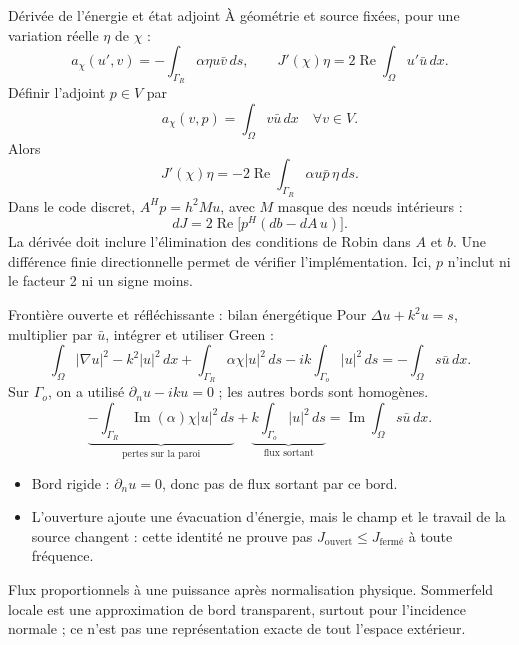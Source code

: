 \begin{frame}{Dérivée de l'énergie et état adjoint}
\small À géométrie et source fixées, pour une variation réelle $\eta$ de $\chi$ :
\[
 a_\chi(u',v)=-\int_{\Gamma_R}\alpha\eta u\bar v\,ds,
 \qquad J'(\chi)\eta=2\operatorname{Re}\int_\Omega u'\bar u\,dx.
\]
Définir l'adjoint $p\in V$ par
\[
 a_\chi(v,p)=\int_\Omega v\bar u\,dx\quad\forall v\in V.
\]
Alors
\[
 \boxed{J'(\chi)\eta=-2\operatorname{Re}\int_{\Gamma_R}\alpha u\bar p\,\eta\,ds.}
\]
Dans le code discret, $A^Hp=h^2Mu$, avec $M$ masque des nœuds intérieurs :
\[
 dJ=2\operatorname{Re}\big[p^H(db-dA\,u)\big].
\]
\scriptsize La dérivée doit inclure l'élimination des conditions de Robin dans $A$ et $b$. Une différence finie directionnelle permet de vérifier l'implémentation. Ici, $p$ n'inclut ni le facteur 2 ni un signe moins.
\end{frame}

\begin{frame}{Frontière ouverte et réfléchissante : bilan énergétique}
\small Pour $\Delta u+k^2u=s$, multiplier par $\bar u$, intégrer et utiliser Green :
\[
 \int_\Omega |\nabla u|^2-k^2|u|^2\,dx+
 \int_{\Gamma_R}\alpha\chi|u|^2\,ds
 -ik\int_{\Gamma_o}|u|^2\,ds=-\int_\Omega s\bar u\,dx.
\]
Sur $\Gamma_o$, on a utilisé $\partial_nu-iku=0$ ; les autres bords sont homogènes.
\[
 \underbrace{-\int_{\Gamma_R}\operatorname{Im}(\alpha)\chi|u|^2\,ds}_{\text{pertes sur la paroi}}
 +\underbrace{k\int_{\Gamma_o}|u|^2\,ds}_{\text{flux sortant}}
 =\operatorname{Im}\int_\Omega s\bar u\,dx.
\]
\begin{itemize}
\item Bord rigide : $\partial_nu=0$, donc pas de flux sortant par ce bord.
\item L'ouverture ajoute une évacuation d'énergie, mais le champ et le travail de la source changent : cette identité ne prouve pas $J_{\text{ouvert}}\leq J_{\text{fermé}}$ à toute fréquence.
\end{itemize}
\scriptsize Flux proportionnels à une puissance après normalisation physique. Sommerfeld locale est une approximation de bord transparent, surtout pour l'incidence normale ; ce n'est pas une représentation exacte de tout l'espace extérieur.
\end{frame}

